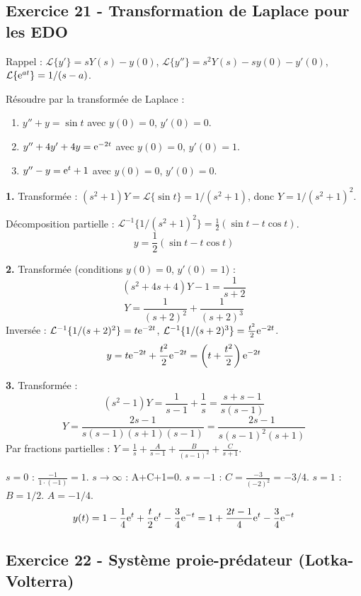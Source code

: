 \documentclass[12pt,a4paper]{article}
\begin{document}
\subsection*{Exercice 21 - Transformation de Laplace pour les EDO \niveau{\moyen}}

\begin{boiteexercice}
Rappel : $\mathcal{L}\{y'\} = sY(s)-y(0)$, $\mathcal{L}\{y''\} = s^2Y(s)-sy(0)-y'(0)$, $\mathcal{L}\{\mathrm{e}^{at}\} = 1/(s-a)$.

Résoudre par la transformée de Laplace :
\begin{enumerate}
  \item $y''+y = \sin t$ avec $y(0)=0$, $y'(0)=0$.
  \item $y''+4y'+4y = \mathrm{e}^{-2t}$ avec $y(0)=0$, $y'(0)=1$.
  \item $y''-y = \mathrm{e}^t + 1$ avec $y(0)=0$, $y'(0)=0$.
\end{enumerate}
\end{boiteexercice}

\begin{boitecorrige}
\textbf{1.} Transformée : $(s^2+1)Y = \mathcal{L}\{\sin t\} = 1/(s^2+1)$, donc $Y = 1/(s^2+1)^2$.

Décomposition partielle : $\mathcal{L}^{-1}\{1/(s^2+1)^2\} = \frac{1}{2}(\sin t - t\cos t)$.
\[
\boxed{y = \frac{1}{2}(\sin t - t\cos t)}
\]

\textbf{2.} Transformée (conditions $y(0)=0$, $y'(0)=1$) :
\[
(s^2+4s+4)Y - 1 = \frac{1}{s+2}
\]
\[
Y = \frac{1}{(s+2)^2} + \frac{1}{(s+2)^3}
\]
Inversée : $\mathcal{L}^{-1}\{1/(s+2)^2\} = t\mathrm{e}^{-2t}$, $\mathcal{L}^{-1}\{1/(s+2)^3\} = \frac{t^2}{2}\mathrm{e}^{-2t}$.
\[
y = t\mathrm{e}^{-2t} + \frac{t^2}{2}\mathrm{e}^{-2t} = \left(t+\frac{t^2}{2}\right)\mathrm{e}^{-2t}
\]

\textbf{3.} Transformée :
\[
(s^2-1)Y = \frac{1}{s-1} + \frac{1}{s} = \frac{s+s-1}{s(s-1)}
\]
\[
Y = \frac{2s-1}{s(s-1)(s+1)(s-1)} = \frac{2s-1}{s(s-1)^2(s+1)}
\]
Par fractions partielles : $Y = \frac{1}{s} + \frac{A}{s-1} + \frac{B}{(s-1)^2} + \frac{C}{s+1}$.

$s=0$ : $\frac{-1}{1\cdot(-1)} = 1$. $s\to\infty$ : A+C+1=0. $s=-1$ : $C = \frac{-3}{(-2)^2} = -3/4$. $s=1$ : $B = 1/2$. $A = -1/4$.
\[
y(t) = 1 - \frac{1}{4}\mathrm{e}^t + \frac{t}{2}\mathrm{e}^t - \frac{3}{4}\mathrm{e}^{-t} = 1 + \frac{2t-1}{4}\mathrm{e}^t - \frac{3}{4}\mathrm{e}^{-t}
\]
\end{boitecorrige}

\subsection*{Exercice 22 - Système proie-prédateur (Lotka-Volterra) \niveau{\difficile}}
\end{document}
